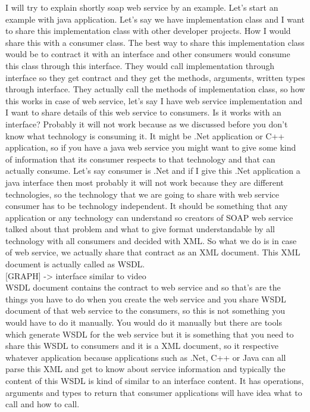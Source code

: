 I will try to explain shortly soap web service by an example. Let’s start an example with java application. Let’s say we have
implementation class and I want to share this implementation class with other developer projects. How I would share this with a
consumer class. The best way to share this implementation class would be to contract it with an interface and other consumers
would consume this class through this interface. They would call implementation through interface so they get contract and they
get the methods, arguments, written types through interface. They actually call the methods of implementation class, so how this
works in case of web service, let’s say I have web service implementation and I want to share details of this web service to
consumers. Is it works with an interface? Probably it will not work because as we discussed before you don’t know what technology
is consuming it. It might be .Net application or C++ application, so if you have a java web service you might want to give some
kind of information that its consumer respects to that technology and that can actually consume. Let’s say consumer is .Net and if I give this .Net
application a java interface then most probably it will not work because they are different technologies, so the technology
that we are going to share with web service consumer has to be technology independent. It should be something that any
application or any technology can understand so creators of SOAP web service talked about that problem and what to give format
understandable by all technology with all consumers and decided with XML. So what we do is in case of web service, we
actually share that contract as an XML document. This XML document is actually called as WSDL.\\

[GRAPH]  -> interface similar to video\\

WSDL document contains the contract to web service and so that’s are the things you have to do when you create the web
service and you share WSDL document of that web service to the consumers, so this is not something you would have to do
it manually. You would do it manually but there are tools which generate WSDL for the web service but it is something that
you need to share this WSDL to consumers and it is a XML document, so it respective whatever application because applications
such as .Net, C++ or Java can all parse this XML and get to know about service information and typically the content of
this WSDL is kind of similar to an interface content. It has operations, arguments and types  to return that consumer
applications will have idea what to call and how to call.\\

